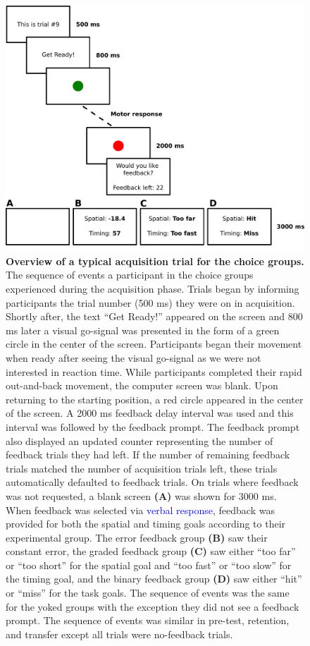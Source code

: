 \documentclass[
  man, donotrepeattitle,floatsintext]{apa7}
\begin{document}
\clearpage

\begin{figure}

{\centering \includegraphics[height=0.45\textheight]{../../figs/fig1} 

}

\caption{\small \normalfont \onehalfspacing \textbf{Overview of a typical acquisition trial for the choice groups.} The sequence of events a participant in the choice groups experienced during the acquisition phase. Trials began by informing participants the trial number (500 ms) they were on in acquisition. Shortly after, the text ``Get Ready!'' appeared on the screen and 800 ms later a visual go-signal was presented in the form of a green circle in the center of the screen. Participants began their movement when ready after seeing the visual go-signal as we were not interested in reaction time. While participants completed their rapid out-and-back movement, the computer screen was blank. Upon returning to the starting position, a red circle appeared in the center of the screen. A 2000 ms feedback delay interval was used and this interval was followed by the feedback prompt. The feedback prompt also displayed an updated counter representing the number of feedback trials they had left. If the number of remaining feedback trials matched the number of acquisition trials left, these trials automatically defaulted to feedback trials. On trials where feedback was not requested, a blank screen \textbf{(A)} was shown for 3000 ms. When feedback was selected via \textcolor{blue}{verbal response}, feedback was provided for both the spatial and timing goals according to their experimental group. The error feedback group \textbf{(B)} saw their constant error, the graded feedback group \textbf{(C)} saw either ``too far'' or ``too short'' for the spatial goal and ``too fast'' or ``too slow'' for the timing goal, and the binary feedback group \textbf{(D)} saw either ``hit'' or ``miss'' for the task goals. The sequence of events was the same for the yoked groups with the exception they did not see a feedback prompt. The sequence of events was similar in pre-test, retention, and transfer except all trials were no-feedback trials.}\label{fig:fig1}
\end{figure}
\end{document}
